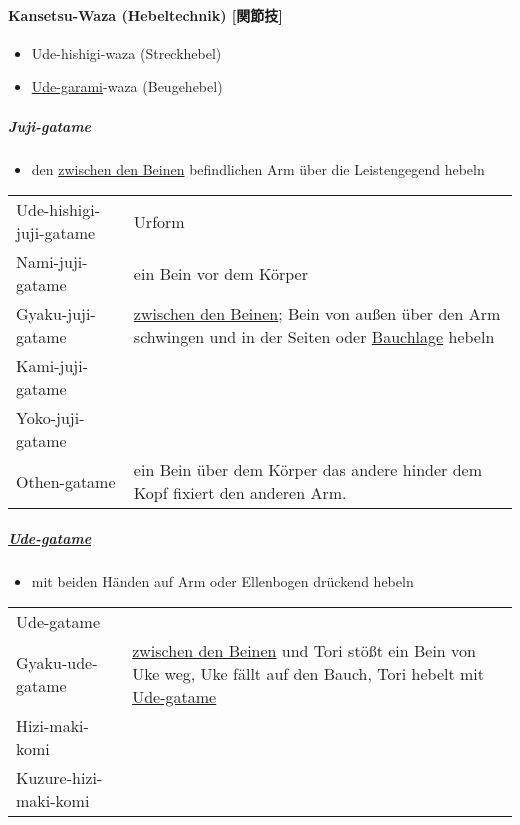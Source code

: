 \documentclass[justified, a4paper, notitlepage, captions=tableheading, nobib]{tufte-handout}
\begin{document}
\paragraph{Kansetsu-Waza (Hebeltechnik) [関節技] }
\label{sec:orgc3bcc26}

\begin{itemize}
\item Ude-hishigi-waza (Streckhebel)
\item \hyperref[org934b11a]{Ude-garami}-waza (Beugehebel)
\end{itemize}

\subparagraph{Juji-gatame}
\label{sec:org032baeb}

\begin{itemize}
\item den \hyperref[orge217f65]{zwischen den Beinen} befindlichen Arm über die Leistengegend hebeln
\end{itemize}

\begin{center}
\begin{tabular}{ll}
\label{org34d45db}Ude-hishigi-juji-gatame & Urform\\
\label{org0b8a80f}Nami-juji-gatame & ein Bein vor dem Körper\\
\label{orgea4ee92}Gyaku-juji-gatame & \hyperref[orge217f65]{zwischen den Beinen}; Bein von außen über den Arm schwingen und in der Seiten oder \hyperref[org69c958b]{Bauchlage} hebeln\\
\label{orgb97f7cb}Kami-juji-gatame & \\
\label{org37df78e}Yoko-juji-gatame & \\
\label{orgfb7e570}Othen-gatame & ein Bein über dem Körper das andere hinder dem Kopf fixiert den anderen Arm.\\
\end{tabular}
\end{center}

\subparagraph{\hyperref[orge20476b]{Ude-gatame}}
\label{sec:org23db45f}

\begin{itemize}
\item mit beiden Händen auf Arm oder Ellenbogen drückend hebeln
\end{itemize}

\begin{center}
\begin{tabular}{ll}
\label{orge20476b}Ude-gatame & \\
\label{orga78eb6e}Gyaku-ude-gatame & \hyperref[orge217f65]{zwischen den Beinen} und Tori stößt ein Bein von Uke weg, Uke fällt auf den Bauch, Tori hebelt mit \hyperref[orge20476b]{Ude-gatame}\\
\label{orgcc7b460}Hizi-maki-komi & \\
\label{org5f099ee}Kuzure-hizi-maki-komi & \\
\end{tabular}
\end{center}
\end{document}
